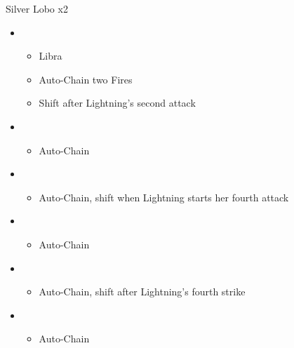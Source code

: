 	\begin{battle}[0:34]{Silver Lobo x2}
		\begin{itemize}
			\item \first
			      \begin{itemize}
				      \item Libra
				      \item Auto-Chain two Fires
				      \item Shift after Lightning's second attack
			      \end{itemize}
			\item \fourth
			      \begin{itemize}
				      \item Auto-Chain
			      \end{itemize}
			\item \sixth
			      \begin{itemize}
				      \item Auto-Chain, shift when Lightning starts her fourth attack
			      \end{itemize}
			\item \first
			      \begin{itemize}
				      \item Auto-Chain
			      \end{itemize}
			\item \fourth
			      \begin{itemize}
				      \item Auto-Chain, shift after Lightning's fourth strike
			      \end{itemize}
			\item \sixth
			      \begin{itemize}
				      \item Auto-Chain
			      \end{itemize}
		\end{itemize}
	\end{battle}

